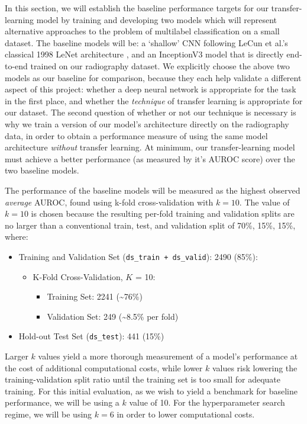 In this section, we will establish the baseline performance targets for our transfer-learning model by training and developing two models which will represent alternative approaches to the problem of multilabel classification on a small dataset. The baseline models will be: a \enquote*{shallow} CNN following LeCun et al.'s classical 1998 LeNet architecture \autocite{lenet1998}, and an InceptionV3 model that is directly end-to-end trained on our radiography dataset. We explicitly choose the above two models as our baseline for comparison, because they each help validate a different aspect of this project: whether a deep neural network is appropriate for the task in the first place, and whether the \emph{technique} of transfer learning is appropriate for our dataset. The second question of whether or not our technique is necessary is why we train a version of our model's architecture directly on the radiography data, in order to obtain a performance measure of using the same model architecture \emph{without} transfer learning. At minimum, our transfer-learning model must achieve a better performance (as measured by it's AUROC score) over the two baseline models.

The performance of the baseline models will be measured as the highest observed \emph{average} AUROC, found using k-fold cross-validation with \(k=10\). The value of \(k=10\) is chosen because the resulting per-fold training and validation splits are no larger than a conventional train, test, and validation split of 70\%, 15\%, 15\%, where:

\begin{itemize}
    \item Training and Validation Set (\texttt{ds\_train + ds\_valid}): 2490 (85\%):
    \begin{itemize}
        \item K-Fold Cross-Validation, $K$ = 10:
        \begin{itemize}
            \item Training Set:  2241  (\textasciitilde76\%)
            \item Validation Set: 249  (\textasciitilde8.5\% per fold)
        \end{itemize}
    \end{itemize}
    \item Hold-out Test Set (\texttt{ds\_test}): 441 (15\%)
\end{itemize}

\noindent
Larger \(k\) values yield a more thorough measurement of a model's performance at the cost of additional computational costs, while lower \(k\) values risk lowering the training-validation split ratio until the training set is too small for adequate training. For this initial evaluation, as we wish to yield a benchmark for baseline performance, we will be using a \(k\) value of 10. For the hyperparameter search regime, we will be using \(k=6\) in order to lower computational costs.

